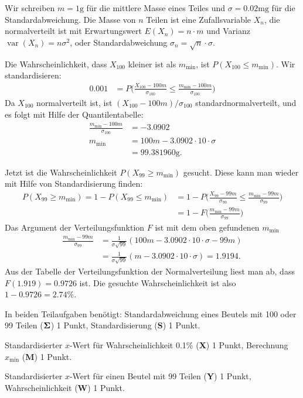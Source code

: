 \begin{loesung}
Wir schreiben $m=1\text{g}$ für die mittlere Masse eines Teiles und
$\sigma=0.02\text{mg}$ für die Standardabweichung.
Die Masse von $n$ Teilen ist eine Zufallsvariable $X_n$, die normalverteilt
ist mit Erwartungswert $E(X_n)=n\cdot m$ und Varianz
$\operatorname{var}(X_n)=n\sigma^2$, oder Standardabweichung
$\sigma_n=\sqrt{n}\cdot\sigma$.
\begin{teilaufgaben}
\item Die Wahrscheinlichkeit, dass $X_{100}$ kleiner ist als $m_{\text{min}}$,
ist
\(
P(X_{100}\le m_{\text{min}})
\). Wir standardisieren:
\begin{align*}
0.001 &= P\biggl(
\frac{X_{100}-100m}{\sigma_{100}}\le \frac{m_{\text{min}}-100m}{\sigma_{100}}
\biggr)
\end{align*}
Da $X_{100}$ normalverteilt ist, ist $(X_{100}-100m)/\sigma_{100}$
standardnormalverteilt, und es folgt mit Hilfe der Quantilentabelle:
\begin{align*}
\frac{m_{\text{min}}-100m}{\sigma_{100}}&=-3.0902\\
m_{\text{min}}&=100m-3.0902\cdot 10\cdot \sigma
\\
&=99.381960\text{g}.
\end{align*}
\item Jetzt ist die Wahrscheinlichkeit $P(X_{99} \ge m_{\text{min}})$ gesucht.
Diese kann man wieder mit Hilfe von Standardisierung finden:
\begin{align*}
P(X_{99} \ge m_{\text{min}})
=
1-P(X_{99} \le m_{\text{min}})
&=
1-P\biggl(
\frac{X_{99}-99m}{\sigma_{99}}\le \frac{m_{\text{min}} - 99m}{\sigma_{99}}
\biggr)
\\
&=1-F\biggl(
\frac{m_{\text{min}} - 99m}{\sigma_{99}}
\biggr)
\end{align*}
Das Argument der Verteilungsfunktion $F$ ist mit dem oben gefundenen
$m_{\text{min}}$
\begin{align*}
\frac{m_{\text{min}} - 99m}{\sigma_{99}}
&=
\frac1{\sigma\sqrt{99}}(
100m-3.0902\cdot 10\cdot \sigma-99m)\\
&=
\frac1{\sigma\sqrt{99}}(m-3.0902\cdot 10\cdot \sigma)
=1.9194.
\end{align*}
Aus der Tabelle der Verteilungsfunktion der Normalverteilung liest man
ab, dass $F(1.919)=0.9726$ ist. Die gesuchte Wahrscheinlichkeit ist
also $1-0.9726=2.74\%$.
\qedhere
\end{teilaufgaben}
\end{loesung}

\begin{bewertung}
In beiden Teilaufgaben benötigt:
Standardabweichung eines Beutels  mit 100 oder 99 Teilen
($\bf \Sigma$) 1 Punkt,
Standardisierung (\textbf{S}) 1 Punkt.
\begin{teilaufgaben}
\item
Standardisierter $x$-Wert für Wahrscheinlichkeit 0.1\% (\textbf{X}) 1 Punkt,
Berechnung $x_{\text{min}}$ (\textbf{M}) 1 Punkt.
\item
Standardisierter $x$-Wert für einen Beutel mit 99 Teilen (\textbf{Y}) 1 Punkt,
Wahrscheinlichkeit (\textbf{W}) 1 Punkt.
\end{teilaufgaben}
\end{bewertung}

